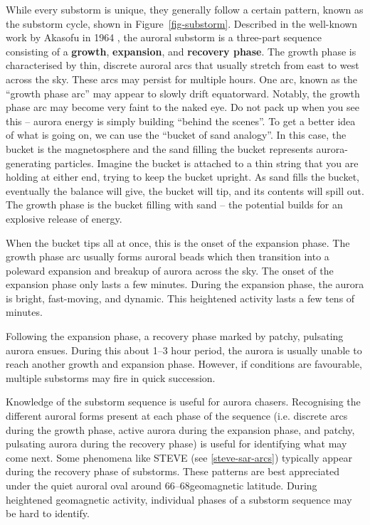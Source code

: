 \documentclass{article}
\renewcommand{\cite}[1]{\parencite{#1}}
\begin{document}
While every substorm is unique, they generally follow a certain pattern, known as the substorm cycle, shown in Figure~\ref{fig-substorm}. Described in the well-known work by Akasofu in 1964 \cite{Akasofu1964}, the auroral substorm is a three-part sequence consisting of a {\bf growth}, {\bf expansion}, and {\bf recovery phase}. The growth phase is characterised by thin, discrete auroral arcs that usually stretch from east to west across the sky. These arcs may persist for multiple hours. One arc, known as the ``growth phase arc'' may appear to slowly drift equatorward. Notably, the growth phase arc may become very faint to the naked eye. Do not pack up when you see this -- aurora energy is simply building ``behind the scenes''. To get a better idea of what is going on, we can use the ``bucket of sand analogy''. In this case, the bucket is the magnetosphere and the sand filling the bucket represents aurora-generating particles. Imagine the bucket is attached to a thin string that you are holding at either end, trying to keep the bucket upright. As sand fills the bucket, eventually the balance will give, the bucket will tip, and its contents will spill out. The growth phase is the bucket filling with sand -- the potential builds for an explosive release of energy. 

When the bucket tips all at once, this is the onset of the expansion phase. The growth phase arc usually forms auroral beads which then transition into a poleward expansion and breakup of aurora across the sky. The onset of the expansion phase only lasts a few minutes. During the expansion phase, the aurora is bright, fast-moving, and dynamic. This heightened activity lasts a few tens of minutes. 

Following the expansion phase, a recovery phase marked by patchy, pulsating aurora ensues. During this about 1--3 hour period, the aurora is usually unable to reach another growth and expansion phase. However, if conditions are favourable, multiple substorms may fire in quick succession.

Knowledge of the substorm sequence is useful for aurora chasers. Recognising the different auroral forms present at each phase of the sequence (i.e. discrete arcs during the growth phase, active aurora during the expansion phase, and patchy, pulsating aurora during the recovery phase) is useful for identifying what may come next. Some phenomena like STEVE (see \ref{steve-sar-arcs}) typically appear during the recovery phase of substorms. These patterns are best appreciated under the quiet auroral oval around 66\textdegree--68\textdegree geomagnetic latitude. During heightened geomagnetic activity, individual phases of a substorm sequence may be hard to identify.
\end{document}
